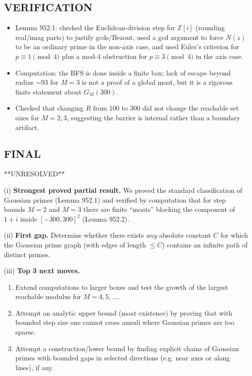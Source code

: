 \subsection*{VERIFICATION}
\begin{itemize}
\item Lemma 952.1: checked the Euclidean-division step for $\mathbb Z[i]$ (rounding real/imag parts) to justify gcds/Bezout, used a gcd argument to force $N(z)$ to be an ordinary prime in the non-axis case, and used Euler's criterion for $p\equiv1\pmod4$ plus a mod-$4$ obstruction for $p\equiv3\pmod4$ in the axis case.
\item Computation: the BFS is done inside a finite box; lack of escape beyond radius $\sim 93$ for $M=3$ is not a proof of a global moat, but it is a rigorous finite statement about $G_M(300)$.
\item Checked that changing $R$ from $100$ to $300$ did not change the reachable set sizes for $M=2,3$, suggesting the barrier is internal rather than a boundary artifact.
\end{itemize}

\subsection*{FINAL}
**UNRESOLVED**

(i) \textbf{Strongest proved partial result.}
We proved the standard classification of Gaussian primes (Lemma 952.1) and verified by computation that for step bounds $M=2$ and $M=3$ there are finite ``moats'' blocking the component of $1+i$ inside $[-300,300]^2$ (Lemma 952.2).

(ii) \textbf{First gap.}
Determine whether there exists \emph{any} absolute constant $C$ for which the Gaussian prime graph (with edges of length $\le C$) contains an infinite path of distinct primes.

(iii) \textbf{Top 3 next moves.}
\begin{enumerate}
\item Extend computations to larger boxes and test the growth of the largest reachable modulus for $M=4,5,\dots$.
\item Attempt an analytic upper bound (moat existence) by proving that with bounded step size one cannot cross annuli where Gaussian primes are too sparse.
\item Attempt a construction/lower bound by finding explicit chains of Gaussian primes with bounded gaps in selected directions (e.g. near axes or along lines), if any.
\end{enumerate}


